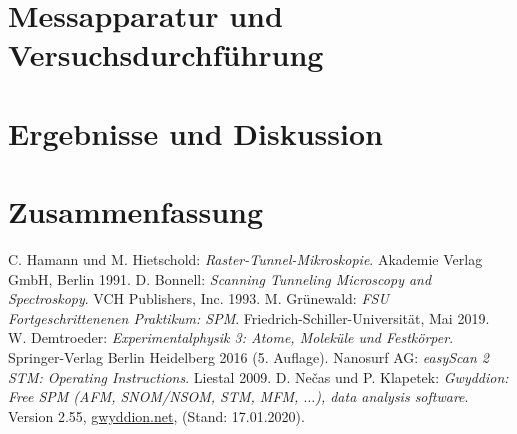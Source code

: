 \documentclass[a4paper,twoside,final]{article}
\begin{document}
\section{Messapparatur und Versuchsdurchführung} \label{sec:Versuchsdurchführung}
\newpage
\section{Ergebnisse und Diskussion}\label{sec:ErgebnisseUndDiskussion}

\section{Zusammenfassung}

\begin{thebibliography}{xxx}
C. Hamann und M. Hietschold: \textit{Raster-Tunnel-Mikroskopie}. Akademie Verlag GmbH, Berlin 1991.
D. Bonnell: \textit{Scanning Tunneling Microscopy and Spectroskopy}. VCH Publishers, Inc. 1993.
M. Grünewald: \textit{FSU Fortgeschrittenenen Praktikum: SPM}. Fried\-rich-Schil\-ler-Uni\-versi\-tät, Mai 2019.
W. Demtroeder: \textit{Experimentalphysik 3: Atome, Moleküle und Festkörper}. Springer-Verlag Berlin Heidelberg 2016 (5. Auflage).
Nanosurf AG: \textit{easyScan 2 STM: Operating Instructions}. Liestal 2009.
D. Nečas und P. Klapetek: \textit{Gwyddion: Free SPM (AFM, SNOM/NSOM, STM, MFM, $\hdots$), data analysis software}. Version 2.55, \url{gwyddion.net}, (Stand: 17.01.2020).
\end{thebibliography}
\end{document}
